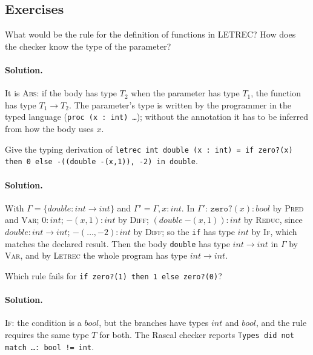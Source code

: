 \subsection{Exercises}

\begin{exercise}
What would be the rule for the definition of functions in LETREC? How does the
checker know the type of the parameter?
\end{exercise}

\paragraph{Solution.} It is \textsc{Abs}: if the body has type $T_2$ when the
parameter has type $T_1$, the function has type $T_1 \to T_2$. The parameter's
type is written by the programmer in the typed language
(\texttt{proc (x : int) \dots}); without the annotation it has to be inferred
from how the body uses $x$.

\begin{exercise}
Give the typing derivation of
\texttt{letrec int double (x : int) = if zero?(x) then 0 else -((double -(x,1)), -2) in double}.
\end{exercise}

\paragraph{Solution.} With $\Gamma = \{\mathit{double} : \mathit{int} \to \mathit{int}\}$ and
$\Gamma' = \Gamma, x : \mathit{int}$. In $\Gamma'$: $\mathtt{zero?}(x) : \mathit{bool}$ by
\textsc{Pred} and \textsc{Var}; $0 : \mathit{int}$; $\mathtt{-}(x, 1) : \mathit{int}$ by
\textsc{Diff}; $(\mathit{double}\ \mathtt{-}(x,1)) : \mathit{int}$ by \textsc{Reduc}, since
$\mathit{double} : \mathit{int} \to \mathit{int}$; $\mathtt{-}(\dots, -2) : \mathit{int}$ by
\textsc{Diff}; so the \texttt{if} has type $\mathit{int}$ by \textsc{If}, which matches
the declared result. Then the body \texttt{double} has type $\mathit{int} \to \mathit{int}$
in $\Gamma$ by \textsc{Var}, and by \textsc{Letrec} the whole program has type
$\mathit{int} \to \mathit{int}$.

\begin{exercise}
Which rule fails for \texttt{if zero?(1) then 1 else zero?(0)}?
\end{exercise}

\paragraph{Solution.} \textsc{If}: the condition is a $\mathit{bool}$, but the branches
have types $\mathit{int}$ and $\mathit{bool}$, and the rule requires the same type
$T$ for both. The Rascal checker reports
\texttt{Types did not match \dots: bool != int}.

